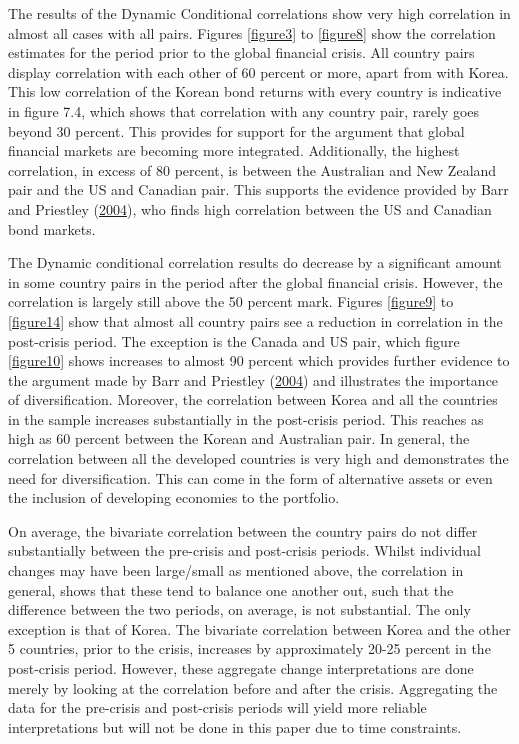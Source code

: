 \documentclass[11pt,preprint, authoryear]{elsarticle}
\numberwithin{equation}{section}
\numberwithin{figure}{section}
\numberwithin{table}{section}
\begin{document}
The results of the Dynamic Conditional correlations show very high
correlation in almost all cases with all pairs. Figures \ref{figure3} to
\ref{figure8} show the correlation estimates for the period prior to the
global financial crisis. All country pairs display correlation with each
other of 60 percent or more, apart from with Korea. This low correlation
of the Korean bond returns with every country is indicative in figure
7.4, which shows that correlation with any country pair, rarely goes
beyond 30 percent. This provides for support for the argument that
global financial markets are becoming more integrated. Additionally, the
highest correlation, in excess of 80 percent, is between the Australian
and New Zealand pair and the US and Canadian pair. This supports the
evidence provided by Barr and Priestley
(\protect\hyperlink{ref-barr2004}{2004}), who finds high correlation
between the US and Canadian bond markets.

The Dynamic conditional correlation results do decrease by a significant
amount in some country pairs in the period after the global financial
crisis. However, the correlation is largely still above the 50 percent
mark. Figures \ref{figure9} to \ref{figure14} show that almost all
country pairs see a reduction in correlation in the post-crisis period.
The exception is the Canada and US pair, which figure \ref{figure10}
shows increases to almost 90 percent which provides further evidence to
the argument made by Barr and Priestley
(\protect\hyperlink{ref-barr2004}{2004}) and illustrates the importance
of diversification. Moreover, the correlation between Korea and all the
countries in the sample increases substantially in the post-crisis
period. This reaches as high as 60 percent between the Korean and
Australian pair. In general, the correlation between all the developed
countries is very high and demonstrates the need for diversification.
This can come in the form of alternative assets or even the inclusion of
developing economies to the portfolio.

On average, the bivariate correlation between the country pairs do not
differ substantially between the pre-crisis and post-crisis periods.
Whilst individual changes may have been large/small as mentioned above,
the correlation in general, shows that these tend to balance one another
out, such that the difference between the two periods, on average, is
not substantial. The only exception is that of Korea. The bivariate
correlation between Korea and the other 5 countries, prior to the
crisis, increases by approximately 20-25 percent in the post-crisis
period. However, these aggregate change interpretations are done merely
by looking at the correlation before and after the crisis. Aggregating
the data for the pre-crisis and post-crisis periods will yield more
reliable interpretations but will not be done in this paper due to time
constraints.
\end{document}

